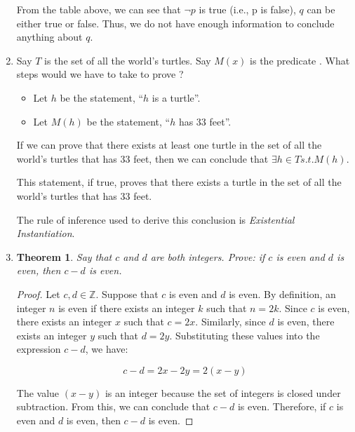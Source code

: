 \documentclass{article}
\newtheorem{theorem}{Theorem}
\begin{document}
\begin{enumerate}
          From the table above, we can see that $\neg p$ is true (i.e., p is false), $q$
          can be either true or false. Thus, we do not have enough information to
          conclude anything about $q$.

          \newpage

    \item Say $T$ is the set of all the world's turtles. Say $M(x)$ is the predicate
          . What steps would we have to take to prove ?

          \begin{itemize}
              \item Let $h$ be the statement, ``$h$ is a turtle''.
              \item Let $M(h)$ be the statement, ``$h$ has $33$ feet''.
          \end{itemize}
          If we can prove that there exists at least one turtle in the set of all the world's turtles that has $33$ feet, then we can conclude that $\exists h \in T    s.t. M(h)$.

          This statement, if true, proves that there exists a turtle in the set of all
          the world's turtles that has $33$ feet.

          The rule of inference used to derive this conclusion is \textit{Existential
              Instantiation}.

          \newpage

    \item \begin{theorem}
              Say that $c$ and $d$ are both integers. Prove: if $c$ is even and $d$ is even,
              then $c-d$ is even.
          \end{theorem}

          \begin{proof}
              Let $c, d \in \mathbb{Z}$. Suppose that $c$ is even and $d$ is even. By definition,
              an integer $n$ is even if there exists an integer $k$ such that $n = 2k$. Since $c$ is
              even, there exists an integer $x$ such that $c = 2x$. Similarly, since $d$ is even,
              there exists an integer $y$ such that $d = 2y$. Substituting these values into the
              expression $c - d$, we have:

              \[c - d = 2x - 2y = 2(x - y)\]

              The value $(x - y)$ is an integer because the set of integers is closed under
              subtraction. From this, we can conclude that $c - d$ is even. Therefore, if $c$
              is even and $d$ is even, then $c - d$ is even.
          \end{proof}

\end{enumerate}
\end{document}
